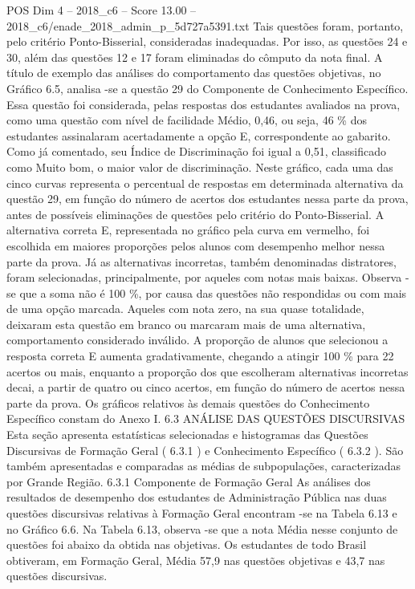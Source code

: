 \begin{textsample}{POS Dim 4 – 2018\_c6 – Score 13.00 – 2018\_c6/enade\_2018\_admin\_p\_5d727a5391.txt}
Tais questões foram, portanto, pelo critério Ponto-Bisserial, consideradas inadequadas.
Por isso, as questões 24 e 30, além das questões 12 e 17 foram eliminadas do cômputo da nota final.
A título de exemplo das análises do comportamento das questões objetivas, no Gráfico 6.5, analisa -se a questão 29 do Componente de Conhecimento Específico.
Essa questão foi considerada, pelas respostas dos estudantes avaliados na prova, como uma questão com nível de facilidade Médio, 0,46, ou seja, 46 \% dos estudantes assinalaram acertadamente a opção E, correspondente ao gabarito.
Como já comentado, seu Índice de Discriminação foi igual a 0,51, classificado como Muito bom, o maior valor de discriminação.
Neste gráfico, cada uma das cinco curvas representa o percentual de respostas em determinada alternativa da questão 29, em função do número de acertos dos estudantes nessa parte da prova, antes de possíveis eliminações de questões pelo critério do Ponto-Bisserial.
A alternativa correta E, representada no gráfico pela curva em vermelho, foi escolhida em maiores proporções pelos alunos com desempenho melhor nessa parte da prova.
Já as alternativas incorretas, também denominadas distratores, foram selecionadas, principalmente, por aqueles com notas mais baixas.
Observa -se que a soma não é 100 \%, por causa das questões não respondidas ou com mais de uma opção marcada.
Aqueles com nota zero, na sua quase totalidade, deixaram esta questão em branco ou marcaram mais de uma alternativa, comportamento considerado inválido.
A proporção de alunos que selecionou a resposta correta E aumenta gradativamente, chegando a atingir 100 \% para 22 acertos ou mais, enquanto a proporção dos que escolheram alternativas incorretas decai, a partir de quatro ou cinco acertos, em função do número de acertos nessa parte da prova.
Os gráficos relativos às demais questões do Conhecimento Específico constam do Anexo I. 6.3 ANÁLISE DAS QUESTÕES DISCURSIVAS Esta seção apresenta estatísticas selecionadas e histogramas das Questões Discursivas de Formação Geral ( 6.3.1 ) e Conhecimento Específico ( 6.3.2 ).
São também apresentadas e comparadas as médias de subpopulações, caracterizadas por Grande Região. 6.3.1 Componente de Formação Geral As análises dos resultados de desempenho dos estudantes de Administração Pública nas duas questões discursivas relativas à Formação Geral encontram -se na Tabela 6.13 e no Gráfico 6.6.
Na Tabela 6.13, observa -se que a nota Média nesse conjunto de questões foi abaixo da obtida nas objetivas.
Os estudantes de todo Brasil obtiveram, em Formação Geral, Média 57,9 nas questões objetivas e 43,7 nas questões discursivas.

\end{textsample}
